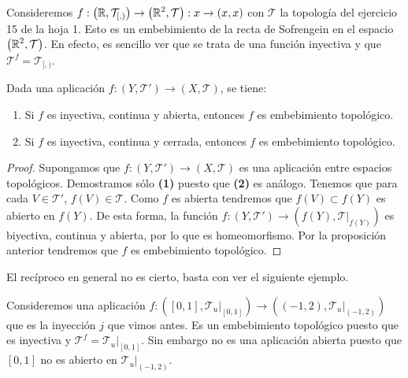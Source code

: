 \begin{eg}
Consideremos $\displaystyle f : \left(\mathbb{R}, \mathcal{T}_{[,)}\right)\to \left(\mathbb{R}^{2}, \mathcal{T}\right): x \to \left(x,x\right) $ con $\displaystyle \mathcal{T} $ la topología del ejercicio 15 de la hoja 1. Esto es un embebimiento de la recta de Sofrengein en el espacio $\displaystyle \left(\mathbb{R}^{2}, \mathcal{T}\right) $.
En efecto, es sencillo ver que se trata de una función inyectiva y que $\displaystyle \mathcal{T}^{f}=\mathcal{T}_{[,)} $. 
\end{eg}
\begin{prop}
Dada una aplicación $\displaystyle f : \left(Y, \mathcal{T}'\right)\to \left(X, \mathcal{T}\right) $, se tiene:
\begin{enumerate}
\item Si $\displaystyle f $ es inyectiva, continua y abierta, entonces $\displaystyle f $ es embebimiento topológico. 
\item Si $\displaystyle f $ es inyectiva, continua y cerrada, entonces $\displaystyle f $ es embebimiento topológico.
\end{enumerate}
\end{prop}
\begin{proof}
Supongamos que $\displaystyle f : \left(Y, \mathcal{T}'\right)\to \left(X, \mathcal{T}\right) $ es una aplicación entre espacios topológicos. Demostramos sólo \textbf{(1)} puesto que \textbf{(2)} es análogo. Tenemos que para cada $\displaystyle V \in \mathcal{T}' $, $\displaystyle f\left(V\right)\in \mathcal{T} $. Como $\displaystyle f $ es abierta tendremos que $\displaystyle f\left(V\right)\subset f\left(Y\right) $ es abierto en $\displaystyle f\left(Y\right) $. De esta forma, la función $\displaystyle f : \left(Y, \mathcal{T}'\right)\to \left(f\left(Y\right), \mathcal{T}|_{f\left(Y\right)}\right) $ es biyectiva, continua y abierta, por lo que es homeomorfismo. Por la proposición anterior tendremos que $\displaystyle f $ es embebimiento topológico.
\end{proof}
\begin{observation}
El recíproco en general no es cierto, basta con ver el siguiente ejemplo.
\end{observation}

\begin{eg}
	Consideremos una aplicación $\displaystyle f : \left(\left[0,1\right] , \mathcal{T}_{u}|_{\left[0,1\right] }\right)\to\left(\left(-1,2\right), \mathcal{T}_{u}|_{\left(-1,2\right)}\right) $ que es la inyección $\displaystyle j $ que vimos antes. Es un embebimiento topológico puesto que es inyectiva y $\displaystyle \mathcal{T}^{f}= \mathcal{T}_{u}|_{\left[0,1\right] } $. Sin embargo no es una aplicación abierta puesto que $\displaystyle \left[0,1\right]  $ no es abierto en $\displaystyle \mathcal{T}_{u}|_{\left(-1,2\right)} $.
\end{eg}

